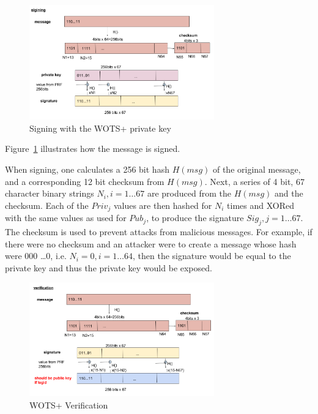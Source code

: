 \documentclass[a4paper,10pt,twocolumn]{article}
\begin{document}
 \begin{figure}[ht]
	\begin{center}
	\includegraphics[width=80mm]{wots_sign.png}
	  \caption{Signing with the WOTS+ private key}
    \label{fig:wots_sign}
	\end{center}
 \end{figure}

 Figure~\ref{fig:wots_sign} illustrates how the message is signed.

 When signing, one calculates a 256 bit hash \( H(msg) \) of the original message, and a corresponding 12 bit checksum from \( H(msg) \).
 Next, a series of 4 bit, 67 character binary strings \(N_i,i=1 \ldots 67\)  are produced from the \(H(msg)\) and the checksum. 
 Each of the \( Priv_j \) values are then hashed for \(N_i\) times and XORed with the same 
 values as used for \( Pub_{j} \), to produce the signature \( Sig_j, j=1 \ldots 67 \). The checksum is used to prevent 
 attacks from malicious messages. For example, if there were no checksum and an attacker were to create a message whose hash were 000 
 \ldots 0, i.e. \( N_i = 0, i=1 \ldots 64 \), then the signature would be equal to the private key and thus the private key would be 
 exposed.

 \begin{figure}[ht]
	\begin{center}
	\includegraphics[width=80mm]{wots_veri.png}
	  \caption{WOTS+ Verification}
    \label{fig:wots_veri}
	\end{center}
 \end{figure}
\end{document}
